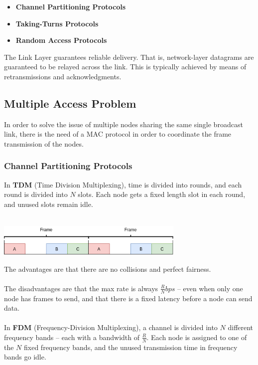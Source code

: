 \documentclass{article}
\begin{document}
\begin{itemize}
	\item \textbf{Channel Partitioning Protocols}
	\item \textbf{Taking-Turns Protocols}
	\item \textbf{Random Access Protocols}
\end{itemize}

The Link Layer guarantees reliable delivery. That is, network-layer datagrams are guaranteed to be relayed across the link. This is typically achieved by means of retransmissions and acknowledgments.

\subsection{Multiple Access Problem}
In order to solve the issue of multiple nodes sharing the same single broadcast link, there is the need of a MAC protocol in order to coordinate the frame transmission of the nodes.

\subsubsection{Channel Partitioning Protocols}
In \textbf{TDM} (Time Division Multiplexing), time is divided into rounds, and each round is divided into $N$ slots. Each node gets a fixed length slot in each round, and unused slots remain idle. \\ \\

\centerline{\includegraphics[width=9cm]{./assets/tdm.png}}
\vspace{.9cm}
\noindent The advantages are that there are no collisions and perfect fairness. \\ \\
The disadvantages are that the max rate is always $\frac{R}{N} bps$ -- even when only one node has frames to send, and that there is a fixed latency before a node can send data. \\ \\
In \textbf{FDM} (Frequency-Division Multiplexing), a channel is divided into $N$ different frequency bands -- each with a bandwidth of $\frac{R}{N}$. Each node is assigned to one of the $N$ fixed frequency bands, and the unused transmission time in frequency bands go idle. \\ \\
\end{document}
